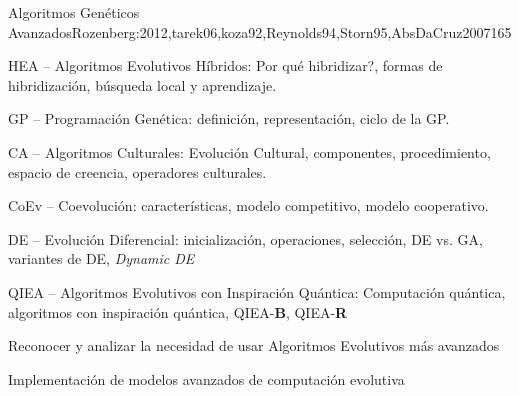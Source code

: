 \begin{syllabus}
\begin{unit}{Algoritmos Genéticos Avanzados}{Rozenberg:2012,tarek06,koza92,Reynolds94,Storn95,AbsDaCruz2007}{16}{5}
\begin{topics}
      \item HEA -- Algoritmos Evolutivos Híbridos: Por qué hibridizar?, formas de hibridización, búsqueda local y aprendizaje.
      \item GP -- Programación Genética: definición, representación, ciclo de la GP. 
      \item CA -- Algoritmos Culturales: Evolución Cultural, componentes, procedimiento, espacio de creencia, operadores culturales.
      \item CoEv -- Coevolución: características, modelo competitivo, modelo cooperativo.
      \item DE -- Evolución Diferencial: inicialización, operaciones, selección, DE vs. GA, variantes de DE, \textit{Dynamic DE}
      \item QIEA -- Algoritmos Evolutivos con Inspiración Quántica: Computación quántica, algoritmos con inspiración quántica, QIEA-{\bf B}, QIEA-{\bf R}
\end{topics}
\begin{unitgoals}
  \item Reconocer y analizar la necesidad de usar Algoritmos Evolutivos más avanzados
  \item Implementación de modelos avanzados de computación evolutiva
\end{unitgoals}
\end{unit}



\begin{coursebibliography}
\end{coursebibliography}

\end{syllabus}
